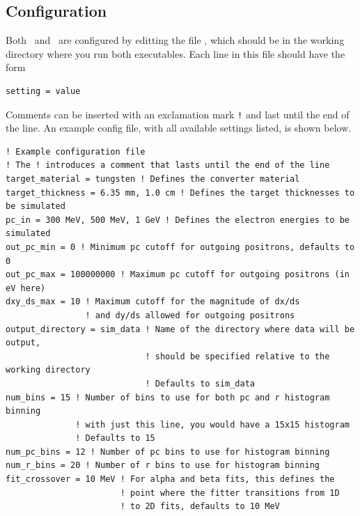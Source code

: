 \documentclass[12pt]{article}
\begin{document}
\subsection{Configuration}
Both \exes \, and \exef \, are configured by editting the file \configfile, which should be in the working directory where you run both executables.
Each line in this file should have the form
\begin{verbatim}
setting = value
\end{verbatim}
Comments can be inserted with an exclamation mark \texttt{!} and last until the end of the line.
An example config file, with all available settings listed, is shown below.
\begin{verbatim}
! Example configuration file
! The ! introduces a comment that lasts until the end of the line
target_material = tungsten ! Defines the converter material
target_thickness = 6.35 mm, 1.0 cm ! Defines the target thicknesses to be simulated
pc_in = 300 MeV, 500 MeV, 1 GeV ! Defines the electron energies to be simulated
out_pc_min = 0 ! Minimum pc cutoff for outgoing positrons, defaults to 0
out_pc_max = 100000000 ! Maximum pc cutoff for outgoing positrons (in eV here)
dxy_ds_max = 10 ! Maximum cutoff for the magnitude of dx/ds
                ! and dy/ds allowed for outgoing positrons
output_directory = sim_data ! Name of the directory where data will be output,
                            ! should be specified relative to the working directory
                            ! Defaults to sim_data
num_bins = 15 ! Number of bins to use for both pc and r histogram binning
              ! with just this line, you would have a 15x15 histogram
              ! Defaults to 15
num_pc_bins = 12 ! Number of pc bins to use for histogram binning
num_r_bins = 20 ! Number of r bins to use for histogram binning
fit_crossover = 10 MeV ! For alpha and beta fits, this defines the
                       ! point where the fitter transitions from 1D
                       ! to 2D fits, defaults to 10 MeV
\end{verbatim}
\newcommand{\targetm}{\texttt{target\_material}}
\newcommand{\targett}{\texttt{target\_thickness}}
\newcommand{\pcin}{\texttt{pc\_in}}
\newcommand{\outpcmin}{\texttt{out\_pc\_min}}
\newcommand{\outpcmax}{\texttt{out\_pc\_max}}
\newcommand{\dxydsmax}{\texttt{dxy\_ds\_max}}
\newcommand{\outdir}{\texttt{output\_directory}}
\newcommand{\numbins}{\texttt{num\_bins}}
\newcommand{\numrbins}{\texttt{num\_r\_bins}}
\newcommand{\numpcbins}{\texttt{num\_pc\_bins}}
\newcommand{\fitxpt}{\texttt{fit\_crossover}}
\end{document}
